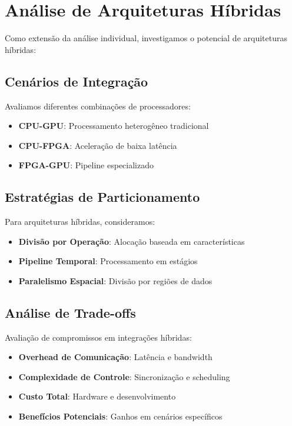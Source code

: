 \section{Análise de Arquiteturas Híbridas}\label{sec:hibridas}

Como extensão da análise individual, investigamos o potencial de arquiteturas híbridas:

\subsection{Cenários de Integração}
Avaliamos diferentes combinações de processadores:

\begin{itemize}
    \item \textbf{CPU-GPU}: Processamento heterogêneo tradicional
    \item \textbf{CPU-FPGA}: Aceleração de baixa latência
    \item \textbf{FPGA-GPU}: Pipeline especializado
\end{itemize}

\subsection{Estratégias de Particionamento}
Para arquiteturas híbridas, consideramos:

\begin{itemize}
    \item \textbf{Divisão por Operação}: Alocação baseada em características
    \item \textbf{Pipeline Temporal}: Processamento em estágios
    \item \textbf{Paralelismo Espacial}: Divisão por regiões de dados
\end{itemize}

\subsection{Análise de Trade-offs}
Avaliação de compromissos em integrações híbridas:

\begin{itemize}
    \item \textbf{Overhead de Comunicação}: Latência e bandwidth
    \item \textbf{Complexidade de Controle}: Sincronização e scheduling
    \item \textbf{Custo Total}: Hardware e desenvolvimento
    \item \textbf{Benefícios Potenciais}: Ganhos em cenários específicos
\end{itemize}

